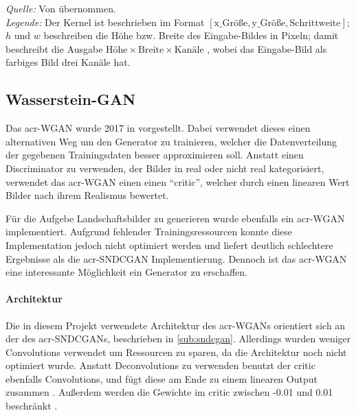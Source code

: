 \begin{table}[]
\begin{center}
\begin{minipage}{.5\linewidth}
\begin{tabular}{lcl}
            \bottomrule
        \end{tabular}
    \end{minipage} 
  \end{center}
  \begin{center}
    \bigskip
    \emph{Quelle:} Von \cite[S. 12]{kurach2018gan} übernommen.\\
    \emph{Legende:} Der Kernel ist beschrieben im Format $[\text{x\_Größe},
    \text{y\_Größe}, \text{Schrittweite}]$; $h$ und $w$ beschreiben die Höhe
    bzw. Breite des Eingabe-Bildes in Pixeln; damit beschreibt die Ausgabe
    $\text{Höhe} \times \text{Breite} \times \text{Kanäle}$ , wobei das
    Eingabe-Bild als farbiges Bild drei Kanäle hat.
  \end{center}
\end{table}
 
 \subsection{Wasserstein-GAN} %
 Das \gls{acr-WGAN} wurde 2017 in 
 \cite{arjovsky_wasserstein_2017} vorgestellt. Dabei verwendet dieses einen
 alternativen Weg um den Generator zu trainieren, welcher die Datenverteilung
 der gegebenen Trainingsdaten besser approximieren soll. Anstatt einen
 Discriminator zu verwenden, der Bilder in real oder nicht real kategorisiert,
 verwendet das \gls{acr-WGAN} einen einen \enquote{critic}, welcher durch einen
 linearen Wert Bilder nach ihrem Realismus bewertet. 
 
 Für die Aufgebe Landschaftsbilder zu generieren wurde ebenfalls ein
 \gls{acr-WGAN} implementiert. Aufgrund fehlender Trainingsressourcen konnte
 diese Implementation jedoch nicht optimiert werden und liefert deutlich
 schlechtere Ergebnisse als die \gls{acr-SNDCGAN} Implementierung. Dennoch ist
 das \gls{acr-WGAN} eine interessante Möglichkeit ein Generator zu erschaffen.  
 
 \paragraph{Architektur} Die in diesem Projekt verwendete Architektur des
 \gls{acr-WGAN}s orientiert sich an der des \gls{acr-SNDCGAN}s, beschrieben in
 \cref{sub:sndcgan}. Allerdings wurden weniger Convolutions verwendet um
 Ressourcen zu sparen, da die Architektur noch nicht optimiert wurde. Anstatt
 Deconvolutions zu verwenden benutzt der critic ebenfalls Convolutions, und fügt
 diese am Ende zu einem linearen Output zusammen \cite{brownlee_how_2019-1}.
 Außerdem werden die Gewichte im critic zwischen -0.01 und 0.01 beschränkt
 \cite{arjovsky_wasserstein_2017}. 
 
